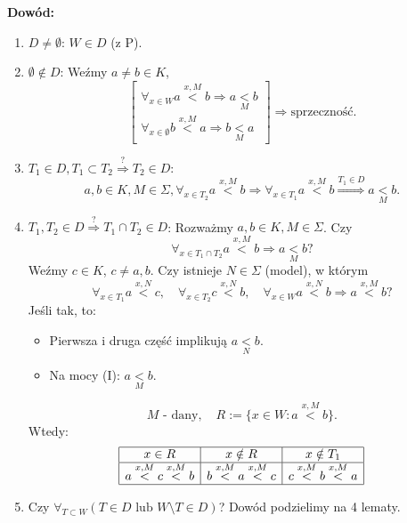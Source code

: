\documentclass[12pt,a4paper]{article}
\theoremstyle{break}
\begin{document}
	\noindent \textbf{Dowód:}
	\begin{enumerate}
		\item $D \neq \emptyset$: $W \in D$ (z P).
		
		\item $\emptyset \notin D$: 
		Weźmy $a \neq b \in K$,
		\[
		\begin{bmatrix}
			\forall_{x \in W} a \overset{x,M}{<} b \Rightarrow a \underset{M}{<} b \\
			\forall_{x \in \emptyset} b \overset{x,M}{<} a \Rightarrow b \underset{M}{<} a
		\end{bmatrix}
		\Rightarrow \text{sprzeczność}.
		\]
		
		\item $T_1 \in D, T_1 \subset T_2 \overset{?}{\Rightarrow} T_2 \in D$: 
		\[
		a, b \in K, M \in \Sigma, \forall_{x \in T_2} a \overset{x,M}{<} b 
		\Rightarrow \forall_{x \in T_1} a \overset{x,M}{<} b \overset{T_1 \in D}{\Rightarrow} a \underset{M}{<} b.
		\]
		
		\item $T_1, T_2 \in D \overset{?}{\Rightarrow} T_1 \cap T_2 \in D$:
		Rozważmy $a, b \in K, M \in \Sigma$. Czy
		\[
		\forall_{x \in T_1 \cap T_2} a \overset{x,M}{<} b \Rightarrow a \underset{M}{<} b?
		\]
		Weźmy $c \in K$, $c \neq a, b$. Czy istnieje $N \in \Sigma$ (model), w którym
		\[
		\forall_{x \in T_1} a \overset{x,N}{<} c, \quad 
		\forall_{x \in T_2} c \overset{x,N}{<} b, \quad 
		\forall_{x \in W} a \overset{x,N}{<} b \Rightarrow a \overset{x,M}{<} b?
		\]
		Jeśli tak, to:
		\begin{itemize}
			\item Pierwsza i druga część implikują $a \underset{N}{<} b$.
			\item Na mocy (I): $a \underset{M}{<} b$.
		\end{itemize}
		\[
		M \text{ - dany}, \quad R := \{x \in W : a \overset{x,M}{<} b\}.
		\]
		Wtedy:
		\[
		\begin{array}{|c|c|c|}
			\hline
			x \in R & x \notin R & x \notin T_1 \\
			\hline
			a \overset{x,M}{<} c \overset{x,M}{<} b & b \overset{x,M}{<} a \overset{x,M}{<} c & c \overset{x,M}{<} b \overset{x,M}{<} a \\
			\hline
		\end{array}
		\]
		
		\item Czy $\forall_{T \subset W} (T \in D \text{ lub } W \setminus T \in D)$?
		Dowód podzielimy na 4 lematy.
	\end{enumerate}
	
\end{document}
